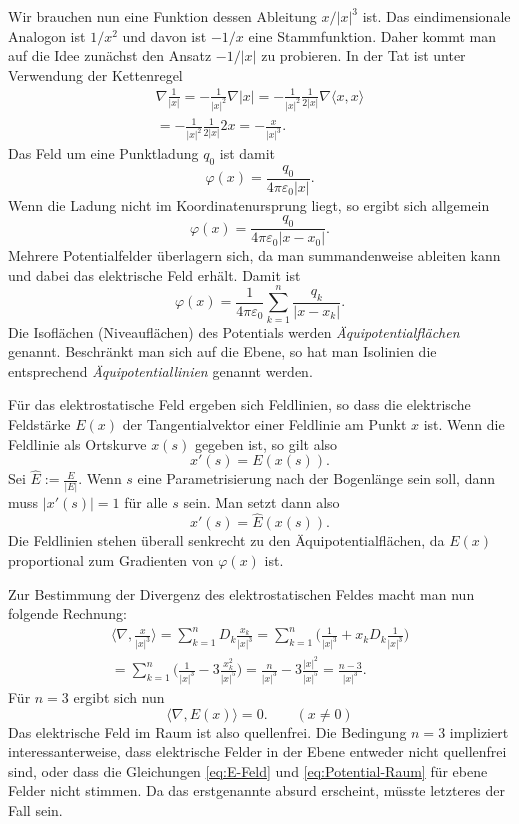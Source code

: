 \documentclass[a4paper,11pt,fleqn,twocolumn,twoside,dvipdfmx]{scrartcl}
\begin{document}
Wir brauchen nun eine Funktion dessen Ableitung
$x/|x|^3$ ist. Das eindimensionale Analogon
ist $1/x^2$ und davon ist $-1/x$ eine Stammfunktion.
Daher kommt man auf die Idee zunächst den Ansatz
$-1/|x|$ zu probieren. In der Tat ist
unter Verwendung der Kettenregel
\begin{gather*}
\nabla\frac{1}{|x|} = -\frac{1}{|x|^2}\nabla |x|
= -\frac{1}{|x|^2}\frac{1}{2|x|}\nabla\langle x,x\rangle\\
= -\frac{1}{|x|^2}\frac{1}{2|x|}2x
= -\frac{x}{|x|^3}.
\end{gather*}
Das Feld um eine Punktladung $q_0$ ist damit
\begin{equation}\label{eq:Potential-Raum}
\varphi(x) = \frac{q_0}{4\pi\varepsilon_0|x|}.
\end{equation}
Wenn die Ladung nicht im Koordinatenursprung liegt, so ergibt
sich allgemein
\[\varphi(x) = \frac{q_0}{4\pi\varepsilon_0|x-x_0|}.\]
Mehrere Potentialfelder überlagern sich, da man summandenweise
ableiten kann und dabei das elektrische Feld erhält.
Damit ist
\[\varphi(x) = \frac{1}{4\pi\varepsilon_0}
\sum_{k=1}^n \frac{q_k}{|x-x_k|}.\]
Die Isoflächen (Niveauflächen)
des Potentials werden \emph{Äquipotentialflächen} genannt.
Beschränkt man sich auf die Ebene, so hat man Isolinien die
entsprechend \emph{Äquipotentiallinien} genannt werden.

Für das elektrostatische Feld ergeben sich Feldlinien, so dass
die elektrische Feldstärke $E(x)$ der Tangentialvektor
einer Feldlinie am Punkt $x$ ist. Wenn die Feldlinie als
Ortskurve $x(s)$ gegeben ist, so gilt also
\[x'(s)=E(x(s)).\]
Sei $\hat E:=\frac{E}{|E|}$. Wenn $s$ eine Parametrisierung nach
der Bogenlänge sein soll, dann muss $|x'(s)|=1$ für alle $s$ sein.
Man setzt dann also
\[x'(s)=\hat E(x(s)).\]
Die Feldlinien stehen überall senkrecht zu den Äquipotentialflächen,
da $E(x)$ proportional zum Gradienten von $\varphi(x)$ ist.

Zur Bestimmung der Divergenz des elektrostatischen Feldes macht man
nun folgende Rechnung:
\begin{gather*}
\langle\nabla,\frac{x}{|x|^3}\rangle
= \sum_{k=1}^n D_k\frac{x_k}{|x|^3}
= \sum_{k=1}^n \bigg(\frac{1}{|x|^3}+x_kD_k\frac{1}{|x|^3}\bigg)\\
= \sum_{k=1}^n \bigg(\frac{1}{|x|^3}-3\frac{x_k^2}{|x|^5}\bigg)
= \frac{n}{|x|^3}-3\frac{|x|^2}{|x|^5}
= \frac{n-3}{|x|^3}.
\end{gather*}
Für $n=3$ ergibt sich nun
\begin{equation}\label{eq:quellenfrei}
\langle\nabla,E(x)\rangle = 0.\qquad (x\ne 0)
\end{equation}
Das elektrische Feld im Raum ist also quellenfrei.
Die Bedingung $n=3$ impliziert interessanterweise, dass elektrische
Felder in der Ebene entweder nicht quellenfrei sind, oder dass
die Gleichungen \eqref{eq:E-Feld} und \eqref{eq:Potential-Raum} für
ebene Felder nicht stimmen. Da das erstgenannte absurd erscheint,
müsste letzteres der Fall sein.
\end{document}

